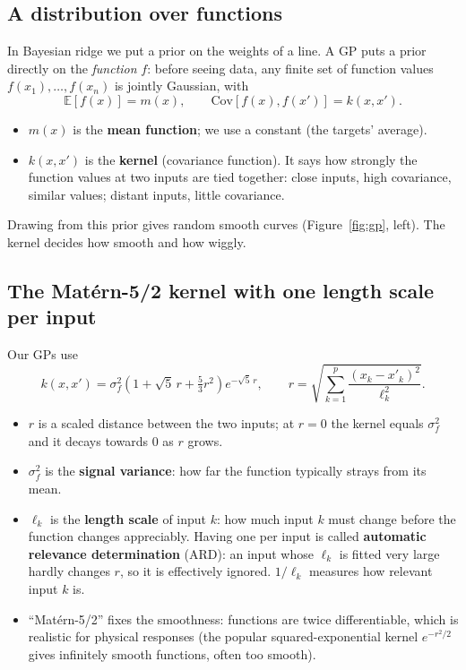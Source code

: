 \documentclass[11pt]{article}
\newcommand{\E}{\mathbb{E}}
\newcommand{\Cov}{\mathrm{Cov}}
\begin{document}
\subsection{A distribution over functions}
In Bayesian ridge we put a prior on the weights of a line. A GP puts a prior directly on the \emph{function} $f$: before seeing data,
any finite set of function values $f(x_1), \dots, f(x_n)$ is jointly Gaussian, with
\begin{equation}
\E[f(x)] = m(x),\qquad \Cov[f(x), f(x')] = k(x, x').
\end{equation}
\begin{itemize}
\item $m(x)$ is the \textbf{mean function}; we use a constant (the targets' average).
\item $k(x, x')$ is the \textbf{kernel} (covariance function). It says how strongly the function values at two inputs are tied
  together: close inputs, high covariance, similar values; distant inputs, little covariance.
\end{itemize}
Drawing from this prior gives random smooth curves (Figure~\ref{fig:gp}, left). The kernel decides how smooth and how wiggly.

\subsection{The Mat\'ern-5/2 kernel with one length scale per input}
Our GPs use
\begin{equation}
k(x, x') = \sigma_f^2\left(1 + \sqrt5\,r + \tfrac53 r^2\right)e^{-\sqrt5\,r},\qquad
r = \sqrt{\sum_{k=1}^{p}\frac{(x_k - x'_k)^2}{\ell_k^2}} .
\label{eq:matern}
\end{equation}
\begin{itemize}
\item $r$ is a scaled distance between the two inputs; at $r = 0$ the kernel equals $\sigma_f^2$ and it decays towards 0 as $r$
  grows.
\item $\sigma_f^2$ is the \textbf{signal variance}: how far the function typically strays from its mean.
\item $\ell_k$ is the \textbf{length scale} of input $k$: how much input $k$ must change before the function changes appreciably.
  Having one per input is called \textbf{automatic relevance determination} (ARD): an input whose $\ell_k$ is fitted very large
  hardly changes $r$, so it is effectively ignored. $1/\ell_k$ measures how relevant input $k$ is.
\item ``Mat\'ern-5/2'' fixes the smoothness: functions are twice differentiable, which is realistic for physical responses (the
  popular squared-exponential kernel $e^{-r^2/2}$ gives infinitely smooth functions, often too smooth).
\end{itemize}
\end{document}

